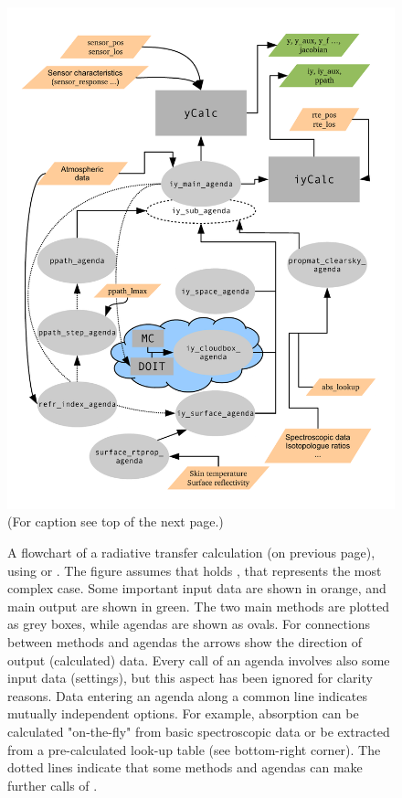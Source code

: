 \begin{figure}[p]
 \begin{center}
  \includegraphics*[clip,trim=25 30 25 40,width=0.99\hsize]{ycalc_flow}\\
  {\small (For caption see top of the next page.)}
 \end{center}
\end{figure}

\begin{figure}[t]
  \caption{A flowchart of a radiative transfer calculation (on previous page),
    using  or . The figure assumes that
     holds , that
    represents the most complex case. Some important input data are shown in
    orange, and main output are shown in green. The two main methods are
    plotted as grey boxes, while agendas are shown as ovals. For
    connections between methods and agendas the arrows show the direction of
    output (calculated) data. Every call of an agenda involves also some input
    data (settings), but this aspect has been ignored for clarity reasons. Data
    entering an agenda along a common line indicates mutually independent
    options. For example, absorption can be calculated "on-the-fly" from basic
    spectroscopic data or be extracted from a pre-calculated look-up table (see
    bottom-right corner). The dotted lines indicate that some methods and
    agendas can make further calls of .}
  \label{fig:ycalc_flow}
\end{figure}

